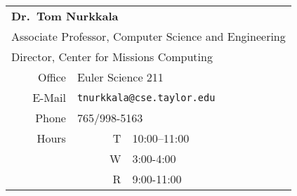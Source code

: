 \begin{center}
  \begin{tabular}{rrl}
    \toprule
    \multicolumn{3}{l}{\textbf{Dr.\ Tom Nurkkala}}                            \\
    \multicolumn{3}{l}{Associate Professor, Computer Science and Engineering} \\
    \multicolumn{3}{l}{Director, Center for Missions Computing}               \\
    \midrule
    Office & \multicolumn{2}{l}{Euler Science 211}                            \\
    E-Mail & \multicolumn{2}{l}{\texttt{tnurkkala@cse.taylor.edu}}            \\
    Phone  & \multicolumn{2}{l}{765/998-5163}                                 \\
    Hours  & T & 10:00--11:00                                                 \\
           & W & 3:00-4:00                                                    \\
           & R & 9:00-11:00                                                   \\
    \bottomrule
  \end{tabular}
\end{center}


